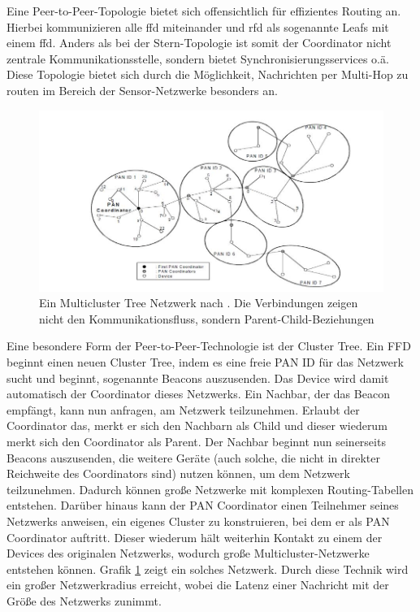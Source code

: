 Eine Peer-to-Peer-Topologie bietet sich offensichtlich für effizientes Routing an. Hierbei kommunizieren alle \ac{ffd} miteinander und \ac{rfd} als sogenannte Leafs mit einem \ac{ffd}. Anders als bei der Stern-Topologie ist somit der Coordinator nicht zentrale Kommunikationsstelle, sondern bietet Synchronisierungsservices o.ä. Diese Topologie bietet sich durch die Möglichkeit, Nachrichten per Multi-Hop zu routen im Bereich der Sensor-Netzwerke besonders an.\\
\begin{figure}
	\centering
	\includegraphics[width=\textwidth]{Grafiken-Alex/multicluster.jpg}
	\caption{Ein Multicluster Tree Netzwerk nach \cite[S.48]{ieee154}. Die Verbindungen zeigen nicht den Kommunikationsfluss, sondern Parent-Child-Beziehungen}
	\label{multicluster}
\end{figure}
Eine besondere Form der Peer-to-Peer-Technologie ist der Cluster Tree. Ein FFD beginnt einen neuen Cluster Tree, indem es eine freie PAN ID für das Netzwerk sucht und beginnt, sogenannte Beacons auszusenden. Das Device wird damit automatisch der Coordinator dieses Netzwerks. Ein Nachbar, der das Beacon empfängt, kann nun anfragen, am Netzwerk teilzunehmen. Erlaubt der Coordinator das, merkt er sich den Nachbarn als Child und dieser wiederum merkt sich den Coordinator als Parent. Der Nachbar beginnt nun seinerseits Beacons auszusenden, die weitere Geräte (auch solche, die nicht in direkter Reichweite des Coordinators sind) nutzen können, um dem Netzwerk teilzunehmen. Dadurch können große Netzwerke mit komplexen Routing-Tabellen entstehen. Darüber hinaus kann der PAN Coordinator einen Teilnehmer seines Netzwerks anweisen, ein eigenes Cluster zu konstruieren, bei dem er als PAN Coordinator auftritt. Dieser wiederum hält weiterhin Kontakt zu einem der Devices des originalen Netzwerks, wodurch große Multicluster-Netzwerke entstehen können. Grafik \ref{multicluster} zeigt ein solches Netzwerk. Durch diese Technik wird ein großer Netzwerkradius erreicht, wobei die Latenz einer Nachricht mit der Größe des Netzwerks zunimmt.\\


